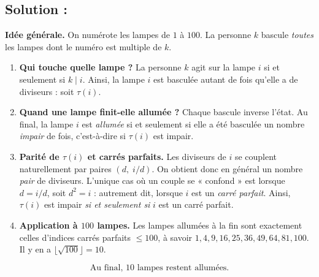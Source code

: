 \subsection*{Solution :}


\textbf{Idée générale.} On numérote les lampes de $1$ à $100$. La personne $k$ bascule \emph{toutes} les lampes dont le numéro est multiple de $k$.

\begin{enumerate}
  \item \textbf{Qui touche quelle lampe ?} 
  La personne $k$ agit sur la lampe $i$ si et seulement si  $k\mid i$. 
  Ainsi, la lampe $i$ est basculée autant de fois qu’elle a de diviseurs : soit $\tau(i)$.

  \item \textbf{Quand une lampe finit-elle allumée ?}
  Chaque bascule inverse l’état. Au final, la lampe $i$ est \emph{allumée} si et seulement si elle a été basculée un nombre \emph{impair} de fois, c’est-à-dire si $\tau(i)$ est impair.

  \item \textbf{Parité de $\tau(i)$ et carrés parfaits.}
  Les diviseurs de $i$ se couplent naturellement par paires $(d,\; i/d)$. 
  On obtient donc en général un nombre \emph{pair} de diviseurs. 
  L’unique cas où un couple se « confond » est lorsque $d=i/d$, soit $d^2=i$ : autrement dit, lorsque $i$ est un \emph{carré parfait}. 
  Ainsi, $\tau(i)$ est impair \emph{si et seulement si} $i$ est un carré parfait.

  \item \textbf{Application à $100$ lampes.}
  Les lampes allumées à la fin sont exactement celles d’indices carrés parfaits $\le 100$, 
  à savoir $1,4,9,16,25,36,49,64,81,100$. 
  Il y en a $\lfloor \sqrt{100}\rfloor = 10$.
\end{enumerate}

\[
\boxed{\,\text{Au final, } 10 \text{ lampes restent allumées.}\,}
\]

